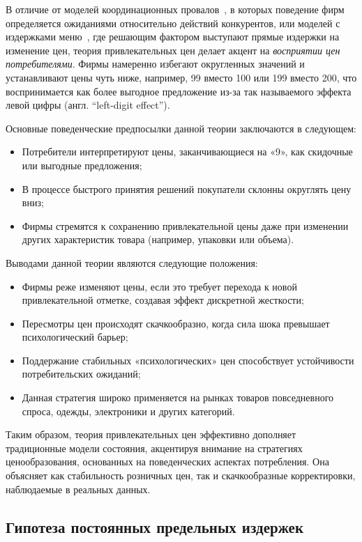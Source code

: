 В отличие от моделей координационных провалов~\cite{BallRomer1987, CooperJohn1988}, в которых поведение фирм определяется ожиданиями относительно действий конкурентов, или моделей с издержками меню~\cite{golosov2007}, где решающим фактором выступают прямые издержки на изменение цен, теория привлекательных цен делает акцент на \textit{восприятии цен потребителями}. Фирмы намеренно избегают округленных значений и устанавливают цены чуть ниже, например, 99 вместо 100 или 199 вместо 200, что воспринимается как более выгодное предложение из-за так называемого эффекта левой цифры (англ. ``left-digit effect'').


Основные поведенческие предпосылки данной теории заключаются в следующем:
\begin{itemize}
	\item Потребители интерпретируют цены, заканчивающиеся на «9», как скидочные или выгодные предложения;
	\item В процессе быстрого принятия решений покупатели склонны округлять цену вниз;
	\item Фирмы стремятся к сохранению привлекательной цены даже при изменении других характеристик товара (например, упаковки или объема).
\end{itemize}

Выводами данной теории являются следующие положения:
\begin{itemize}
	\item Фирмы реже изменяют цены, если это требует перехода к новой привлекательной отметке, создавая эффект дискретной жесткости;
	\item Пересмотры цен происходят скачкообразно, когда сила шока превышает психологический барьер;
	\item Поддержание стабильных «психологических» цен способствует устойчивости потребительских ожиданий;
	\item Данная стратегия широко применяется на рынках товаров повседневного спроса, одежды, электроники и других категорий.
\end{itemize}

Таким образом, теория привлекательных цен эффективно дополняет традиционные модели состояния, акцентируя внимание на стратегиях ценообразования, основанных на поведенческих аспектах потребления. Она объясняет как стабильность розничных цен, так и скачкообразные корректировки, наблюдаемые в реальных данных.

\subsection{Гипотеза постоянных предельных издержек}\label{subsec:ch1/sec2/cmc}

